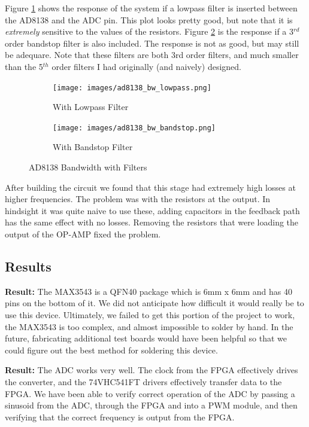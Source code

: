 \documentclass[a4paper, 12pt, notitlepage]{article}
\begin{document}
Figure \ref{fig:ad8138_bw_lowpass} shows the response of the system if a lowpass filter is inserted between the AD8138 and the ADC pin.  This plot looks pretty good, but note that it is \textit{extremely} sensitive to the values of the resistors.  Figure \ref{fig:ad8138_bw_bandstop} is the response if a 3$^{rd}$ order bandstop filter is also included.  The response is not as good, but may still be adequare.  Note that these filters are both 3rd order filters, and much smaller than the 5$^{th}$ order filters I had originally (and naively) designed.

\begin{figure}[ht]
\centering
\begin{subfigure}[b]{0.45\textwidth}
  \texttt{[image: images/ad8138\_bw\_lowpass.png]}
  \caption{With Lowpass Filter}
  \label{fig:ad8138_bw_lowpass}
\end{subfigure}
\begin{subfigure}[b]{0.45\textwidth}
  \texttt{[image: images/ad8138\_bw\_bandstop.png]}
  \caption{With Bandstop Filter}
  \label{fig:ad8138_bw_bandstop}
\end{subfigure}

\caption{AD8138 Bandwidth with Filters}
\label{fig:ad8138_bw_filters}
\end{figure}

After building the circuit we found that this stage had extremely high losses at higher frequencies.  The problem was with the resistors at the output.  In hindsight it was quite naive to use these, adding capacitors in the feedback path has the same effect with no losses.  Removing the resistors that were loading the output of the OP-AMP fixed the problem.

\subsection{Results}

\textbf{Result:} The MAX3543 is a QFN40 package which is 6mm x 6mm and has 40 pins on the bottom of it.  We did not anticipate how difficult it would really be to use this device.  Ultimately, we failed to get this portion of the project to work, the MAX3543 is too complex, and almost impossible to solder by hand.  In the future, fabricating additional test boards would have been helpful so that we could figure out the best method for soldering this device.

\textbf{Result:} The ADC works very well.  The clock from the FPGA effectively drives the converter, and the 74VHC541FT drivers effectively transfer data to the FPGA.  We have been able to verify correct operation of the ADC by passing a sinusoid from the ADC, through the FPGA and into a PWM module, and then verifying that the correct frequency is output from the FPGA.
\end{document}
